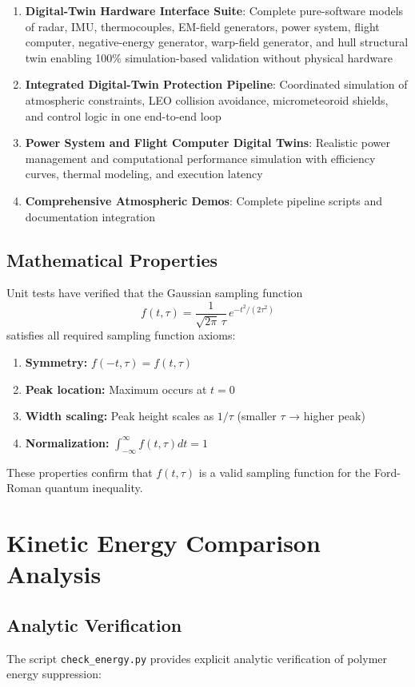 \documentclass[11pt]{article}
\begin{document}
\begin{enumerate}
\item \textbf{Digital-Twin Hardware Interface Suite}: Complete pure-software models of radar, IMU, thermocouples, EM-field generators, power system, flight computer, negative-energy generator, warp-field generator, and hull structural twin enabling 100\% simulation-based validation without physical hardware
\item \textbf{Integrated Digital-Twin Protection Pipeline}: Coordinated simulation of atmospheric constraints, LEO collision avoidance, micrometeoroid shields, and control logic in one end-to-end loop
\item \textbf{Power System and Flight Computer Digital Twins}: Realistic power management and computational performance simulation with efficiency curves, thermal modeling, and execution latency
\item \textbf{Comprehensive Atmospheric Demos}: Complete pipeline scripts and documentation integration
\end{enumerate}

\subsection{Mathematical Properties}
Unit tests have verified that the Gaussian sampling function
\begin{equation}
f(t,\tau) = \frac{1}{\sqrt{2\pi}\,\tau}\,e^{-t^2/(2\tau^2)}
\end{equation}
satisfies all required sampling function axioms:

\begin{enumerate}
\item \textbf{Symmetry:} $f(-t,\tau) = f(t,\tau)$ 
\item \textbf{Peak location:} Maximum occurs at $t = 0$
\item \textbf{Width scaling:} Peak height scales as $1/\tau$ (smaller $\tau$ → higher peak)
\item \textbf{Normalization:} $\int_{-\infty}^{\infty} f(t,\tau) dt = 1$
\end{enumerate}

These properties confirm that $f(t,\tau)$ is a valid sampling function for the Ford-Roman quantum inequality.

\section{Kinetic Energy Comparison Analysis}

\subsection{Analytic Verification}
The script \texttt{check\_energy.py} provides explicit analytic verification of polymer energy suppression:
\end{document}
